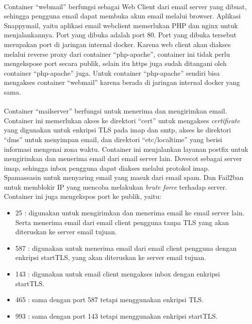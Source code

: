 \documentclass[./bab_3.tex]{subfiles}
\begin{document}
\paragraph*{}Container ``webmail'' berfungsi sebagai Web
Client dari email server yang dibuat, sehingga pengguna
email dapat membuka akun email melalui browser.
Aplikasi Snappymail, yaitu aplikasi email webclient
memerlukan PHP dan nginx untuk menjalankannya. Port yang
dibuka adalah port 80. Port yang dibuka tersebut merupakan
port di jaringan internal docker. Karena web client akan
diakses melalui reverse proxy dari container ``php-apache'',
container ini tidak perlu mengekspose port secara publik,
selain itu https juga sudah ditangani oleh container
``php-apache'' juga. Untuk container ``php-apache'' sendiri bisa
mengakses container ``webmail'' karena berada di jaringan
internal docker yang sama.

\paragraph*{}Container ``mailserver'' berfungsi untuk
menerima dan mengirimkan email. Container ini memerlukan
akses ke direktori ``cert'' untuk mengakses \textit{certificate}
yang digunakan untuk enkripsi TLS pada imap dan smtp, akses
ke direktori ``dms'' untuk menyimpan email, dan direktori
``etc/localtime'' yang berisi informasi mengenai zona waktu.
Container ini menjalankan layanan postfix untuk mengirimkan
dan menerima email dari email server lain. Dovecot sebagai
server imap, sehingga inbox pengguna dapat diakses melalui
protokol imap. Spamassasin untuk menyaring email yang masuk
dari email spam. Dan Fail2ban untuk memblokir IP yang
mencoba melakukan \textit{brute force} terhadap server.
Container ini juga mengekspos port ke publik, yaitu:
\begin{itemize}
  \item 25 : digunakan untuk mengirimkan dan menerima email
    ke email server lain. Serta menerima email dari email
    client pengguna tanpa TLS yang akan diteruskan ke server
    email tujuan.
  \item 587 : digunakan untuk menerima email dari email
    client pengguna dengan enkripsi startTLS, yang akan
    diteruskan ke server email tujuan.
  \item 143 : digunakan untuk email client mengakses inbox
    dengan enkripsi startTLS.
  \item 465 : sama dengan port 587 tetapi menggunakan
    enkripsi TLS.
  \item 993 : sama dengan port 143 tetapi menggunakan
    enkripsi startTLS.
\end{itemize}
\end{document}
